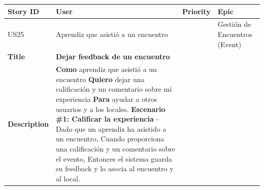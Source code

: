 {\def\LTcaptype{none} %
\begin{longtable}[]{@{}
  >{\raggedright\arraybackslash}p{}
  >{\raggedright\arraybackslash}p{}
  >{\raggedright\arraybackslash}p{}
  >{\raggedright\arraybackslash}p{}@{}}
\toprule\noalign{}
\begin{minipage}[b]{\linewidth}\raggedright
Story ID
\end{minipage} & \begin{minipage}[b]{\linewidth}\raggedright
User
\end{minipage} & \begin{minipage}[b]{\linewidth}\raggedright
Priority
\end{minipage} & \begin{minipage}[b]{\linewidth}\raggedright
Epic
\end{minipage} \\
\midrule\noalign{}
\endhead
\bottomrule\noalign{}
\endlastfoot
US25 & Aprendiz que asistió a un encuentro & 3 & Gestión de Encuentros
(Event) \\
\textbf{Title} & \textbf{Dejar feedback de un encuentro} & & \\
\textbf{Description} & \textbf{Como} aprendiz que asistió a un encuentro
\textbf{Quiero} dejar una calificación y un comentario sobre mi
experiencia \textbf{Para} ayudar a otros usuarios y a los locales.
\textbf{Escenario \#1: Calificar la experiencia} - Dado que un aprendiz
ha asistido a un encuentro, Cuando proporciona una calificación y un
comentario sobre el evento, Entonces el sistema guarda su feedback y lo
asocia al encuentro y al local. & & \\
\end{longtable}
}

